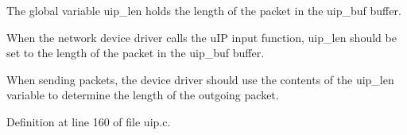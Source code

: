 The global variable uip\_\-len holds the length of the packet in the uip\_\-buf buffer.

When the network device driver calls the uIP input function, uip\_\-len should be set to the length of the packet in the uip\_\-buf buffer.

When sending packets, the device driver should use the contents of the uip\_\-len variable to determine the length of the outgoing packet. 

Definition at line 160 of file uip.c.

